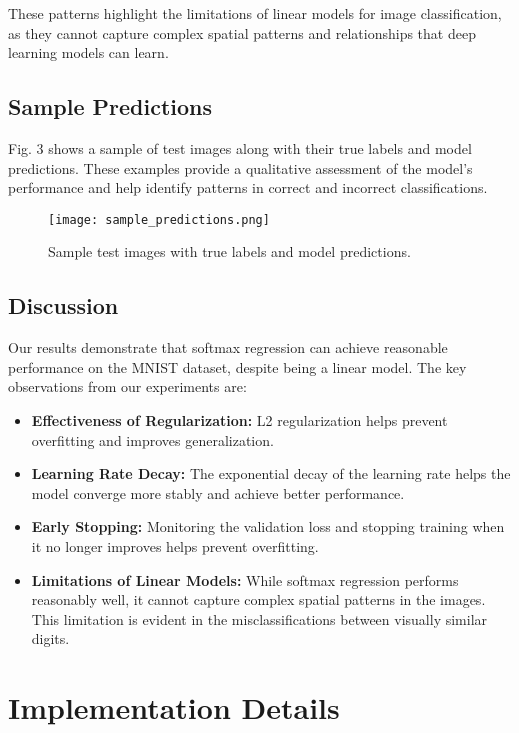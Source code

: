 \documentclass[10pt,journal,compsoc]{IEEEtran}
\begin{document}
These patterns highlight the limitations of linear models for image classification, as they cannot capture complex spatial patterns and relationships that deep learning models can learn.

\subsection{Sample Predictions}
Fig. 3 shows a sample of test images along with their true labels and model predictions. These examples provide a qualitative assessment of the model's performance and help identify patterns in correct and incorrect classifications.

\begin{figure}[htbp]
\centering
\texttt{[image: sample\_predictions.png]}
\caption{Sample test images with true labels and model predictions.}
\label{fig:sample_predictions}
\end{figure}

\subsection{Discussion}
Our results demonstrate that softmax regression can achieve reasonable performance on the MNIST dataset, despite being a linear model. The key observations from our experiments are:

\begin{itemize}
    \item \textbf{Effectiveness of Regularization:} L2 regularization helps prevent overfitting and improves generalization.
    
    \item \textbf{Learning Rate Decay:} The exponential decay of the learning rate helps the model converge more stably and achieve better performance.
    
    \item \textbf{Early Stopping:} Monitoring the validation loss and stopping training when it no longer improves helps prevent overfitting.
    
    \item \textbf{Limitations of Linear Models:} While softmax regression performs reasonably well, it cannot capture complex spatial patterns in the images. This limitation is evident in the misclassifications between visually similar digits.
\end{itemize}

\section{Implementation Details}
\end{document}
